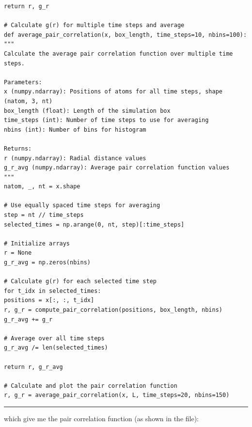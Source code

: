 \documentclass[a4paper]{article}
\begin{document}
{\begin{lstlisting}
return r, g_r

# Calculate g(r) for multiple time steps and average
def average_pair_correlation(x, box_length, time_steps=10, nbins=100):
"""
Calculate the average pair correlation function over multiple time steps.

Parameters:
x (numpy.ndarray): Positions of atoms for all time steps, shape (natom, 3, nt)
box_length (float): Length of the simulation box
time_steps (int): Number of time steps to use for averaging
nbins (int): Number of bins for histogram

Returns:
r (numpy.ndarray): Radial distance values
g_r_avg (numpy.ndarray): Average pair correlation function values
"""
natom, _, nt = x.shape

# Use equally spaced time steps for averaging
step = nt // time_steps
selected_times = np.arange(0, nt, step)[:time_steps]

# Initialize arrays
r = None
g_r_avg = np.zeros(nbins)

# Calculate g(r) for each selected time step
for t_idx in selected_times:
positions = x[:, :, t_idx]
r, g_r = compute_pair_correlation(positions, box_length, nbins)
g_r_avg += g_r

# Average over all time steps
g_r_avg /= len(selected_times)

return r, g_r_avg

# Calculate and plot the pair correlation function
r, g_r = average_pair_correlation(x, L, time_steps=20, nbins=150)
\end{lstlisting}}
\rule{\textwidth}{1pt}
which give me the pair correlation function (as shown in the file):\\
\end{document}
